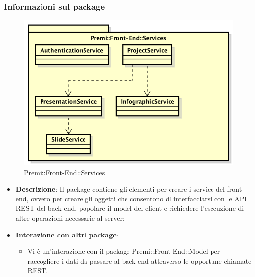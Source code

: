 \subsubsection*{Informazioni sul package}
\begin{figure}[h]
	\centering
	\includegraphics[width=0.9\linewidth]{img/front-end_services}
	\caption[Premi::Front-End::Services]{Premi::Front-End::Services}
\end{figure}
\begin{itemize}
	\item \textbf{Descrizione}: Il package contiene gli elementi per creare i service del \gls{front-end}, ovvero per creare gli oggetti che consentono di interfacciarsi con le API \gls{REST} del \gls{back-end}, popolare il model del client e richiedere l'esecuzione di altre operazioni necessarie al server;
	\item \textbf{Interazione con altri package}:
	\begin{itemize}
		\item Vi è un'interazione con il package Premi::Front-End::Model per raccogliere i dati da passare al back-end attraverso le opportune chiamate REST.
	\end{itemize}
\end{itemize}

